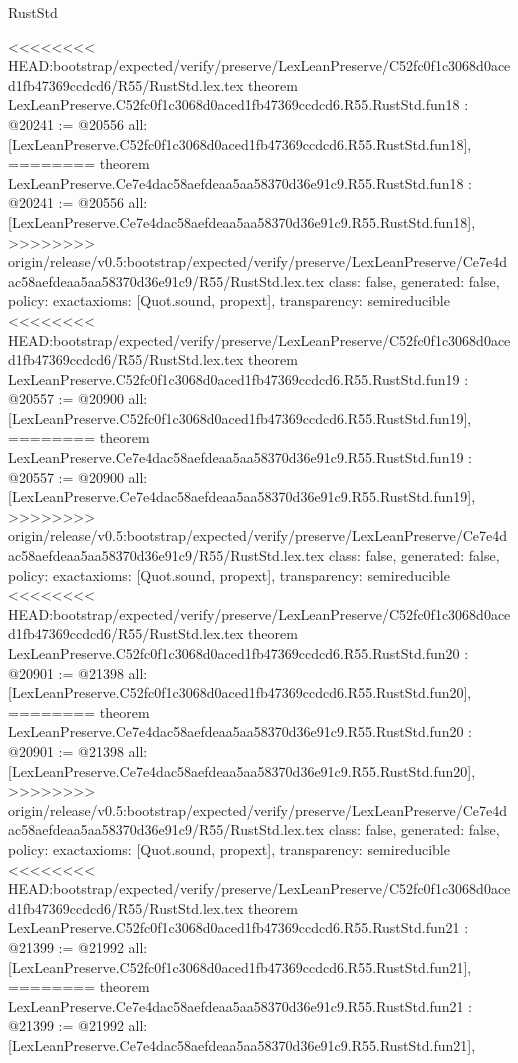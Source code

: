 \begin{lexlean}{RustStd}
\begin{coremodule}
{\begin{coremodule}
{{{{{{{{{{{{{{{{{{{{{}
<<<<<<<< HEAD:bootstrap/expected/verify/preserve/LexLeanPreserve/C52fc0f1c3068d0aced1fb47369ccdcd6/R55/RustStd.lex.tex
theorem LexLeanPreserve.C52fc0f1c3068d0aced1fb47369ccdcd6.R55.RustStd.fun18 : @20241 := @20556 {
  all: [LexLeanPreserve.C52fc0f1c3068d0aced1fb47369ccdcd6.R55.RustStd.fun18],
========
theorem LexLeanPreserve.Ce7e4dac58aefdeaa5aa58370d36e91c9.R55.RustStd.fun18 : @20241 := @20556 {
  all: [LexLeanPreserve.Ce7e4dac58aefdeaa5aa58370d36e91c9.R55.RustStd.fun18],
>>>>>>>> origin/release/v0.5:bootstrap/expected/verify/preserve/LexLeanPreserve/Ce7e4dac58aefdeaa5aa58370d36e91c9/R55/RustStd.lex.tex
  class: false,
  generated: false,
  policy: exact{axioms: [Quot.sound, propext]},
  transparency: semireducible
}
<<<<<<<< HEAD:bootstrap/expected/verify/preserve/LexLeanPreserve/C52fc0f1c3068d0aced1fb47369ccdcd6/R55/RustStd.lex.tex
theorem LexLeanPreserve.C52fc0f1c3068d0aced1fb47369ccdcd6.R55.RustStd.fun19 : @20557 := @20900 {
  all: [LexLeanPreserve.C52fc0f1c3068d0aced1fb47369ccdcd6.R55.RustStd.fun19],
========
theorem LexLeanPreserve.Ce7e4dac58aefdeaa5aa58370d36e91c9.R55.RustStd.fun19 : @20557 := @20900 {
  all: [LexLeanPreserve.Ce7e4dac58aefdeaa5aa58370d36e91c9.R55.RustStd.fun19],
>>>>>>>> origin/release/v0.5:bootstrap/expected/verify/preserve/LexLeanPreserve/Ce7e4dac58aefdeaa5aa58370d36e91c9/R55/RustStd.lex.tex
  class: false,
  generated: false,
  policy: exact{axioms: [Quot.sound, propext]},
  transparency: semireducible
}
<<<<<<<< HEAD:bootstrap/expected/verify/preserve/LexLeanPreserve/C52fc0f1c3068d0aced1fb47369ccdcd6/R55/RustStd.lex.tex
theorem LexLeanPreserve.C52fc0f1c3068d0aced1fb47369ccdcd6.R55.RustStd.fun20 : @20901 := @21398 {
  all: [LexLeanPreserve.C52fc0f1c3068d0aced1fb47369ccdcd6.R55.RustStd.fun20],
========
theorem LexLeanPreserve.Ce7e4dac58aefdeaa5aa58370d36e91c9.R55.RustStd.fun20 : @20901 := @21398 {
  all: [LexLeanPreserve.Ce7e4dac58aefdeaa5aa58370d36e91c9.R55.RustStd.fun20],
>>>>>>>> origin/release/v0.5:bootstrap/expected/verify/preserve/LexLeanPreserve/Ce7e4dac58aefdeaa5aa58370d36e91c9/R55/RustStd.lex.tex
  class: false,
  generated: false,
  policy: exact{axioms: [Quot.sound, propext]},
  transparency: semireducible
}
<<<<<<<< HEAD:bootstrap/expected/verify/preserve/LexLeanPreserve/C52fc0f1c3068d0aced1fb47369ccdcd6/R55/RustStd.lex.tex
theorem LexLeanPreserve.C52fc0f1c3068d0aced1fb47369ccdcd6.R55.RustStd.fun21 : @21399 := @21992 {
  all: [LexLeanPreserve.C52fc0f1c3068d0aced1fb47369ccdcd6.R55.RustStd.fun21],
========
theorem LexLeanPreserve.Ce7e4dac58aefdeaa5aa58370d36e91c9.R55.RustStd.fun21 : @21399 := @21992 {
  all: [LexLeanPreserve.Ce7e4dac58aefdeaa5aa58370d36e91c9.R55.RustStd.fun21],
}}}}}}}}}}}}}}}}}}}}}}}}}
\end{coremodule}}
\end{coremodule}
\end{lexlean}
